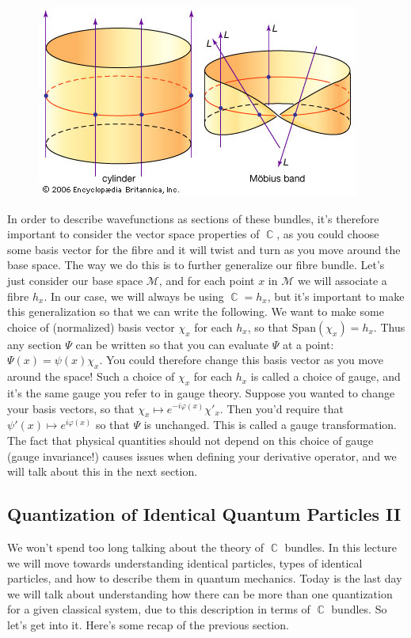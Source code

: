 \documentclass{article}
\DeclareMathOperator{\CC}{\mathbb{C}}
\begin{document}
\begin{figure}[h]
    \centering
    \includegraphics[width=\linewidth]{Figures/mobius_bundle.jpg}
    \caption*{}
    \label{fig:24}
\end{figure}

In order to describe wavefunctions as sections of these bundles, it's therefore important to consider the vector space properties of $\CC$, as you could choose some basis vector for the fibre and it will twist and turn as you move around the base space. The way we do this is to further generalize our fibre bundle. Let's just consider our base space $\mathcal{M}$, and for each point $x$ in $\mathcal{M}$ we will associate a fibre $h_x$. In our case, we will always be using $\CC = h_x$, but it's important to make this generalization so that we can write the following. We want to make some choice of (normalized) basis vector $\chi_x$ for each $h_x$, so that $\textrm{Span}(\chi_x) = h_x$. Thus any section $\Psi$ can be written so that you can evaluate $\Psi$ at a point: $\Psi(x) = \psi(x)\chi_x$. You could therefore change this basis vector as you move around the space! Such a choice of $\chi_x$ for each $h_x$ is called a choice of gauge, and it's the same gauge you refer to in gauge theory. Suppose you wanted to change your basis vectors, so that $\chi_x \mapsto e^{-i\varphi(x)}\chi'_x$. Then you'd require that $\psi'(x) \mapsto e^{i\varphi(x)}$ so that $\Psi$ is unchanged. This is called a gauge transformation. The fact that physical quantities should not depend on this choice of gauge (gauge invariance!) causes issues when defining your derivative operator, and we will talk about this in the next section.

\subsection{Quantization of Identical Quantum Particles II}
We won't spend too long talking about the theory of $\CC$ bundles. In this lecture we will move towards understanding identical particles, types of identical particles, and how to describe them in quantum mechanics. Today is the last day we will talk about understanding how there can be more than one quantization for a given classical system, due to this description in terms of $\CC$ bundles. So let's get into it. Here's some recap of the previous section.
\end{document}
